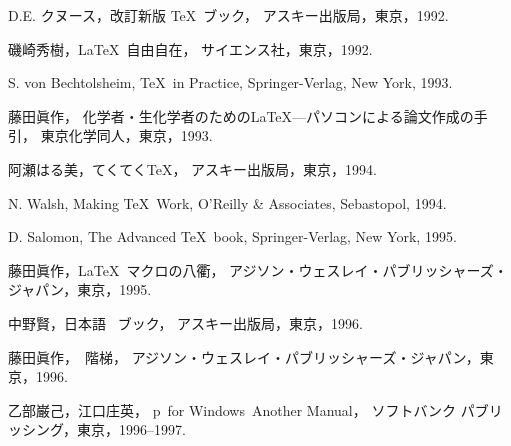 \documentclass[a4paper,10pt,onecolumn,oneside,openany]{jsbook}
\begin{document}
\begin{thebibliography}{99}





D.E. クヌース，改訂新版 \TeX\ ブック，
アスキー出版局，東京，1992. 

磯崎秀樹，\LaTeX\ 自由自在，
サイエンス社，東京，1992. 


S. von Bechtolsheim, \TeX\ in Practice, 
Springer-Verlag, New York, 1993. 


藤田眞作，
化学者・生化学者のための\LaTeX---パソコンによる論文作成の手引，
東京化学同人，東京，1993. 


阿瀬はる美，てくてく\TeX{}，
アスキー出版局，東京，1994. 

N. Walsh, Making \TeX\ Work, 
O'Reilly \& Associates, Sebastopol, 1994. 

D. Salomon, The Advanced \TeX\ book, 
Springer-Verlag, New York, 1995.

藤田眞作，\LaTeX\ マクロの八衢，
アジソン・ウェスレイ・パブリッシャーズ・ジャパン，東京，1995. 

中野賢，日本語 \LaTeXe\ ブック，
アスキー出版局，東京，1996. 

藤田眞作，\LaTeXe\ 階梯，
アジソン・ウェスレイ・パブリッシャーズ・ジャパン，東京，1996. 

乙部巌己，江口庄英，
p\LaTeXe\ for Windows\ Another Manual，
ソフトバンク パブリッシング，東京，1996--1997. 


\end{thebibliography}
\end{document}
